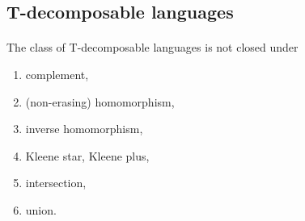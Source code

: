 \subsection{T-decomposable languages}

\paragraph{}
\cveta The class of T-decomposable languages is not closed under 
\begin{enumerate}
\item complement,
\item (non-erasing) homomorphism,
\item inverse homomorphism,
\item Kleene star, Kleene plus,
\item intersection,
\item union.
\end{enumerate}

